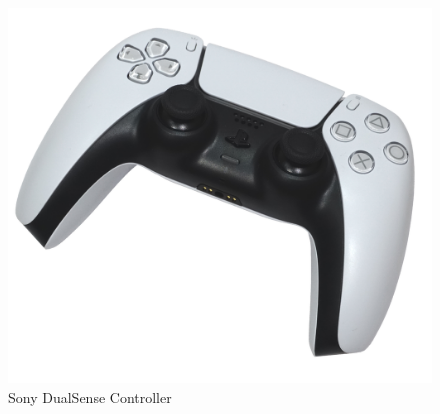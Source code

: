 \begin{figure}[!htb]
  \includegraphics[width=\linewidth]{img/sony-dual.png}
  \caption{Sony DualSense Controller \cite{FilePlay5online}}\label{fig:sony-dual}
\endminipage\hfill
{}

\end{figure}
